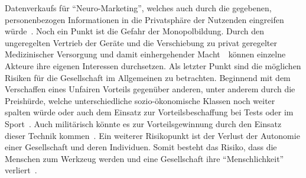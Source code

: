 \documentclass[a4paper,
DIV=13,
12pt,
BCOR=10mm,
department=FakEI,
twoside,
parskip=half,
automark,
]{OTHRartcl}
\begin{document}
Datenverkaufs für ``Neuro-Marketing'', welches auch durch die gegebenen, personenbezogen Informationen in die Privatsphäre der Nutzenden eingreifen würde~\cite{khan_aziz_2019}. Noch ein Punkt ist die Gefahr der Monopolbildung.
Durch den ungeregelten Vertrieb der Geräte und die Verschiebung zu privat geregelter Medizinischer Versorgung und damit einhergehender Macht~\cite{khan_aziz_2019}~können einzelne Akteure ihre eigenen Interessen durchsetzen.
Als letzter Punkt sind die möglichen Risiken für die Gesellschaft im Allgemeinen zu betrachten. Beginnend mit dem Verschaffen eines Unfairen Vorteils gegenüber anderen, unter anderem durch die Preishürde, welche unterschiedliche
sozio-ökonomische Klassen noch weiter spalten würde oder auch dem Einsatz zur Vorteilsbeschaffung bei Tests oder im Sport~\cite{khan_aziz_2019}. Auch militärisch könnte es zur Vorteilsgewinnung durch den Einsatz dieser Technik
kommen~\cite{khan_aziz_2019}. Ein weiterer Risikopunkt ist der Verlust der Autonomie einer Gesellschaft und deren Individuen. Somit besteht das Risiko, dass die Menschen zum Werkzeug werden und eine Gesellschaft ihre ``Menschlichkeit''
verliert~\cite{Burwell:2017aa}.


\newpage


\newpage
\end{document}
